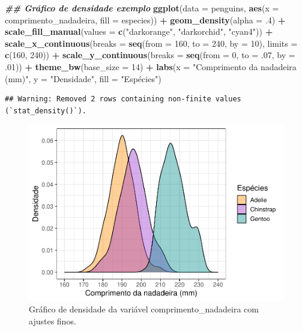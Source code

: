 \documentclass[
]{article}
\newenvironment{Shaded}{\begin{snugshade}}{\end{snugshade}}
\newcommand{\AttributeTok}[1]{\textcolor[rgb]{0.13,0.29,0.53}{#1}}
\newcommand{\DecValTok}[1]{\textcolor[rgb]{0.00,0.00,0.81}{#1}}
\newcommand{\DocumentationTok}[1]{\textcolor[rgb]{0.56,0.35,0.01}{\textbf{\textit{#1}}}}
\newcommand{\FunctionTok}[1]{\textcolor[rgb]{0.13,0.29,0.53}{\textbf{#1}}}
\newcommand{\NormalTok}[1]{#1}
\newcommand{\SpecialCharTok}[1]{\textcolor[rgb]{0.81,0.36,0.00}{\textbf{#1}}}
\newcommand{\StringTok}[1]{\textcolor[rgb]{0.31,0.60,0.02}{#1}}
\begin{document}
\begin{Shaded}
\begin{Highlighting}[]
\DocumentationTok{\#\# Gráfico de densidade exemplo}
\FunctionTok{ggplot}\NormalTok{(}\AttributeTok{data =}\NormalTok{ penguins, }\FunctionTok{aes}\NormalTok{(}\AttributeTok{x =}\NormalTok{ comprimento\_nadadeira, }\AttributeTok{fill =}\NormalTok{ especies)) }\SpecialCharTok{+}
    \FunctionTok{geom\_density}\NormalTok{(}\AttributeTok{alpha =}\NormalTok{ .}\DecValTok{4}\NormalTok{) }\SpecialCharTok{+}
    \FunctionTok{scale\_fill\_manual}\NormalTok{(}\AttributeTok{values =} \FunctionTok{c}\NormalTok{(}\StringTok{"darkorange"}\NormalTok{, }\StringTok{"darkorchid"}\NormalTok{, }\StringTok{"cyan4"}\NormalTok{)) }\SpecialCharTok{+}
    \FunctionTok{scale\_x\_continuous}\NormalTok{(}\AttributeTok{breaks =} \FunctionTok{seq}\NormalTok{(}\AttributeTok{from =} \DecValTok{160}\NormalTok{, }\AttributeTok{to =} \DecValTok{240}\NormalTok{, }\AttributeTok{by =} \DecValTok{10}\NormalTok{), }\AttributeTok{limits =} \FunctionTok{c}\NormalTok{(}\DecValTok{160}\NormalTok{, }\DecValTok{240}\NormalTok{)) }\SpecialCharTok{+}
    \FunctionTok{scale\_y\_continuous}\NormalTok{(}\AttributeTok{breaks =} \FunctionTok{seq}\NormalTok{(}\AttributeTok{from =} \DecValTok{0}\NormalTok{, }\AttributeTok{to =}\NormalTok{ .}\DecValTok{07}\NormalTok{, }\AttributeTok{by =}\NormalTok{ .}\DecValTok{01}\NormalTok{)) }\SpecialCharTok{+}
    \FunctionTok{theme\_bw}\NormalTok{(}\AttributeTok{base\_size =} \DecValTok{14}\NormalTok{) }\SpecialCharTok{+}
    \FunctionTok{labs}\NormalTok{(}\AttributeTok{x =} \StringTok{"Comprimento da nadadeira (mm)"}\NormalTok{, }\AttributeTok{y =} \StringTok{"Densidade"}\NormalTok{, }\AttributeTok{fill =} \StringTok{"Espécies"}\NormalTok{)}
\end{Highlighting}
\end{Shaded}

\begin{verbatim}
## Warning: Removed 2 rows containing non-finite values (`stat_density()`).
\end{verbatim}

\begin{figure}
\includegraphics[width=0.75\linewidth,height=0.75\textheight]{epr_files/figure-latex/fig-dens-fino-1} \caption{Gráfico de densidade da variável comprimento_nadadeira com ajustes finos.}\label{fig:fig-dens-fino}
\end{figure}
\end{document}
